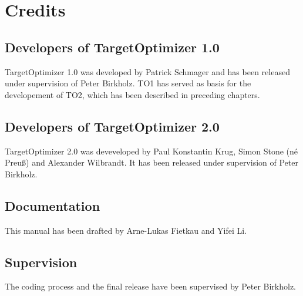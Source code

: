 \chapter{Credits}
\section{Developers of TargetOptimizer 1.0}
TargetOptimizer 1.0 was developed by Patrick Schmager and has been released under supervision of Peter Birkholz. TO1 has served as basis for the developement of TO2, which has been described in preceding chapters.

\section{Developers of TargetOptimizer 2.0}
TargetOptimizer 2.0 was deveveloped by Paul Konstantin Krug, Simon Stone (né Preuß) and Alexander Wilbrandt. It has been released under supervision of Peter Birkholz.

\section{Documentation}
This manual has been drafted by Arne-Lukas Fietkau and Yifei Li.

\section{Supervision}
The coding process and the final release have been supervised by Peter Birkholz.

